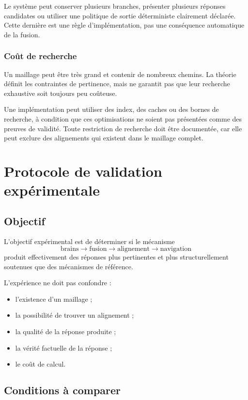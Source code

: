\documentclass[11pt,a4paper]{report}
\theoremstyle{definition}
\theoremstyle{plain}
\theoremstyle{remark}
\begin{document}
Le système peut conserver plusieurs branches, présenter plusieurs
réponses candidates ou utiliser une politique de sortie
déterministe clairement déclarée. Cette dernière est une règle
d'implémentation, pas une conséquence automatique de la fusion.

\subsection{Coût de recherche}

Un maillage peut être très grand et contenir de nombreux chemins.
La théorie définit les contraintes de pertinence, mais ne garantit
pas que leur recherche exhaustive soit toujours peu coûteuse.

Une implémentation peut utiliser des index, des caches ou des
bornes de recherche, à condition que ces optimisations ne soient
pas présentées comme des preuves de validité. Toute restriction
de recherche doit être documentée, car elle peut exclure des
alignements qui existent dans le maillage complet.

\chapter{Protocole de validation expérimentale}

\section{Objectif}

L'objectif expérimental est de déterminer si le mécanisme
\[
\text{brains}
\to
\text{fusion}
\to
\text{alignement}
\to
\text{navigation}
\]
produit effectivement des réponses plus pertinentes et plus
structurellement soutenues que des mécanismes de référence.

L'expérience ne doit pas confondre :
\begin{itemize}
  \item l'existence d'un maillage ;
  \item la possibilité de trouver un alignement ;
  \item la qualité de la réponse produite ;
  \item la vérité factuelle de la réponse ;
  \item le coût de calcul.
\end{itemize}

\section{Conditions à comparer}
\end{document}
